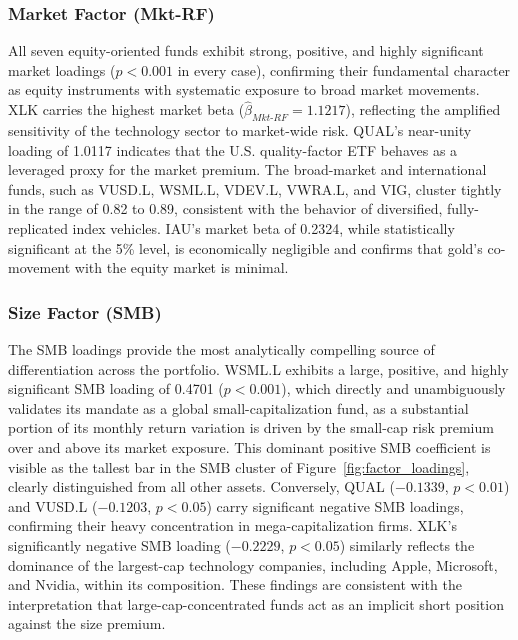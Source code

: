 \documentclass[12pt]{article}
\begin{document}
\subsubsection{Market Factor (Mkt-RF)}
All seven equity-oriented funds exhibit strong, positive, and highly significant market loadings ($p < 0.001$ in every case), confirming their fundamental character as equity instruments with systematic exposure to broad market movements. XLK carries the highest market beta ($\hat{\beta}_{Mkt\text{-}RF} = 1.1217$), reflecting the amplified sensitivity of the technology sector to market-wide risk. QUAL's near-unity loading of 1.0117 indicates that the U.S. quality-factor ETF behaves as a leveraged proxy for the market premium. The broad-market and international funds, such as VUSD.L, WSML.L, VDEV.L, VWRA.L, and VIG, cluster tightly in the range of 0.82 to 0.89, consistent with the behavior of diversified, fully-replicated index vehicles. IAU's market beta of 0.2324, while statistically significant at the 5\% level, is economically negligible and confirms that gold's co-movement with the equity market is minimal.

\subsubsection{Size Factor (SMB)}
The SMB loadings provide the most analytically compelling source of differentiation across the portfolio. WSML.L exhibits a large, positive, and highly significant SMB loading of 0.4701 ($p < 0.001$), which directly and unambiguously validates its mandate as a global small-capitalization fund, as a substantial portion of its monthly return variation is driven by the small-cap risk premium over and above its market exposure. This dominant positive SMB coefficient is visible as the tallest bar in the SMB cluster of Figure~\ref{fig:factor_loadings}, clearly distinguished from all other assets. Conversely, QUAL ($-0.1339$, $p < 0.01$) and VUSD.L ($-0.1203$, $p < 0.05$) carry significant negative SMB loadings, confirming their heavy concentration in mega-capitalization firms. XLK's significantly negative SMB loading ($-0.2229$, $p < 0.05$) similarly reflects the dominance of the largest-cap technology companies, including Apple, Microsoft, and Nvidia, within its composition. These findings are consistent with the interpretation that large-cap-concentrated funds act as an implicit short position against the size premium.
\end{document}
